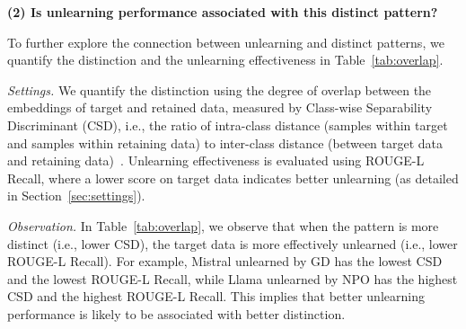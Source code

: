 \noindent\textbf{(2) Is unlearning performance associated with this distinct pattern?} 

To further explore the connection between unlearning and distinct patterns, we quantify the distinction and the unlearning effectiveness in Table~\ref{tab:overlap}.

\textit{Settings.} We quantify the distinction using the degree of overlap between the embeddings of target and retained data, measured by Class-wise Separability Discriminant (CSD), i.e., the ratio of intra-class distance (samples within target and samples within retaining data) to inter-class distance (between target data and retaining data)~\cite{rentransferable, klecka1980discriminant}. Unlearning effectiveness is evaluated using ROUGE-L Recall, where a lower score on target data indicates better unlearning (as detailed in Section~\ref{sec:settings}). 

\textit{Observation.}
In Table~\ref{tab:overlap}, we observe that when the pattern is more distinct (i.e., lower CSD), the target data is more effectively unlearned (i.e., lower ROUGE-L Recall). For example, Mistral unlearned by GD has the lowest CSD and the lowest ROUGE-L Recall, while Llama unlearned by NPO has the highest CSD and the highest ROUGE-L Recall.
This implies that better unlearning performance is likely to be associated with better distinction.

\begin{table}[t]
    \centering
    \caption{Unlearning effectiveness and distinction}
    \vspace{-0.15in}
  \label{tab:overlap}
\end{table}



